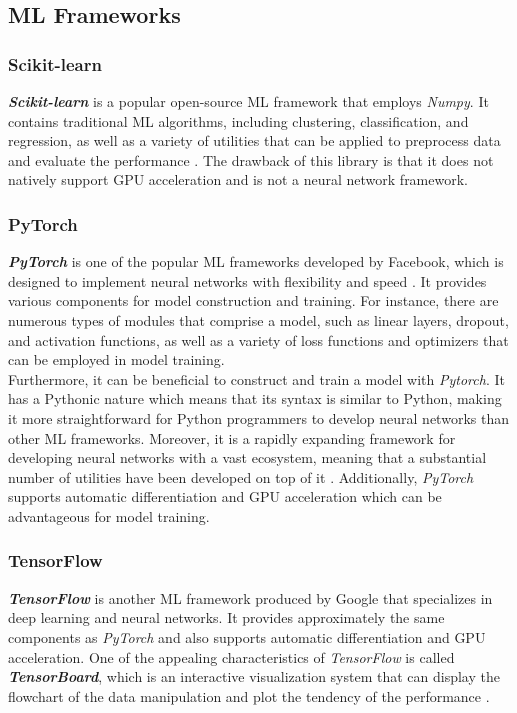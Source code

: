 \documentclass[12pt,twoside]{report}
\begin{document}
\subsection{ML Frameworks}
\subsubsection{Scikit-learn}
\textit{\textbf{Scikit-learn}} is a popular open-source ML framework that employs \textit{Numpy}. It contains traditional ML algorithms, including clustering, classification, and regression, as well as a variety of utilities that can be applied to preprocess data and evaluate the performance \citep{RN7}. The drawback of this library is that it does not natively support GPU acceleration and is not a neural network framework. 

\subsubsection{PyTorch}
\textbf{\textit{PyTorch}} is one of the popular ML frameworks developed by Facebook, which is designed to implement neural networks with flexibility and speed \citep{RN5}. It provides various components for model construction and training. For instance, there are numerous types of modules that comprise a model, such as linear layers, dropout, and activation functions, as well as a variety of loss functions and optimizers that can be employed in model training. 
\\

Furthermore, it can be beneficial to construct and train a model with \textit{Pytorch}. It has a Pythonic nature which means that its syntax is similar to Python, making it more straightforward for Python programmers to develop neural networks than other ML frameworks. Moreover, it is a rapidly expanding framework for developing neural networks with a vast ecosystem, meaning that a substantial number of utilities have been developed on top of it \citep{RN5}. Additionally, \textit{PyTorch} supports automatic differentiation and GPU acceleration which can be advantageous for model training.

\subsubsection{TensorFlow}
\textit{\textbf{TensorFlow}} is another ML framework produced by Google that specializes in deep learning and neural networks. It provides approximately the same components as \textit{PyTorch} and also supports automatic differentiation and GPU acceleration. One of the appealing characteristics of \textit{TensorFlow} is called \textit{\textbf{TensorBoard}}, which is an interactive visualization system that can display the flowchart of the data manipulation and plot the tendency of the performance \citep{RN15}. 
\end{document}
